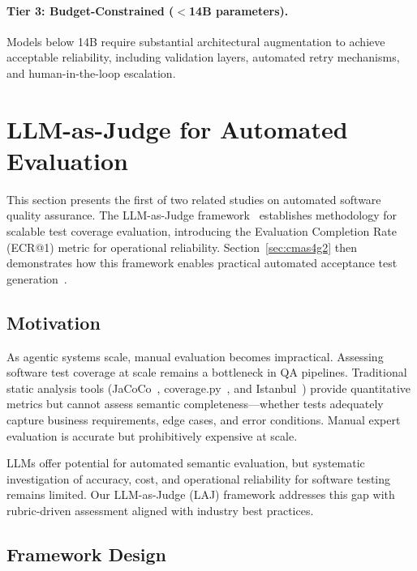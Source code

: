 \paragraph{Tier 3: Budget-Constrained ($<$14B parameters).} Models below 14B require substantial architectural augmentation to achieve acceptable reliability, including validation layers, automated retry mechanisms, and human-in-the-loop escalation.


\section{LLM-as-Judge for Automated Evaluation}
\label{sec:llm_judge}

This section presents the first of two related studies on automated software quality assurance. The LLM-as-Judge framework~\cite{huang2026judge} establishes methodology for scalable test coverage evaluation, introducing the Evaluation Completion Rate (ECR@1) metric for operational reliability. Section~\ref{sec:cmas4g2} then demonstrates how this framework enables practical automated acceptance test generation~\cite{huang2026open}.

\subsection{Motivation}

As agentic systems scale, manual evaluation becomes impractical. Assessing software test coverage at scale remains a bottleneck in QA pipelines. Traditional static analysis tools (JaCoCo~\cite{crap4j2010}, coverage.py~\cite{coveragepy}, and Istanbul~\cite{istanbul}) provide quantitative metrics but cannot assess semantic completeness---whether tests adequately capture business requirements, edge cases, and error conditions. Manual expert evaluation is accurate but prohibitively expensive at scale.

LLMs offer potential for automated semantic evaluation, but systematic investigation of accuracy, cost, and operational reliability for software testing remains limited. Our LLM-as-Judge (LAJ) framework addresses this gap with rubric-driven assessment aligned with industry best practices.

\subsection{Framework Design}

